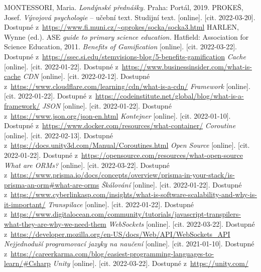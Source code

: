 \begin{thebibliography}{99}
    
     MONTESSORI, Maria. \textit{Londýnské přednášky.}  Praha: Portál, 2019.
      PROKEŠ, Josef. \textit{Vývojová psychologie} – učební text. Studijní text. [online]. [cit. 2022-03-20]. Dostupné z~\url{https://www.fi.muni.cz/~qprokes/socka/socka3.html}
     HARLEN, Wynne (ed.). ASE \textit{guide to primary science education.} Hatfield: Association for Science Education, 2011.
     \textit{Benefits of Gamification} [online]. [cit. 2022-03-22]. Dostupné z~\url{https://ssec.si.edu/stemvisions-blog/5-benefits-gamification}
     \textit{Cache} [online]. [cit. 2022-01-22]. Dostupné z~\url{https://www.businessinsider.com/what-is-cache}
     \textit{CDN} [online]. [cit. 2022-02-12]. Dostupné z~\url{https://www.cloudflare.com/learning/cdn/what-is-a-cdn/}
     \textit{Framework} [online]. [cit. 2022-01-22]. Dostupné z~\url{https://codeinstitute.net/global/blog/what-is-a-framework/}
     \textit{JSON} [online]. [cit. 2022-01-22]. Dostupné z~\url{https://www.json.org/json-en.html}
     \textit{Kontejner} [online]. [cit. 2022-01-10]. Dostupné z~\url{https://www.docker.com/resources/what-container/}
     \textit{Coroutine} [online]. [cit. 2022-02-13]. Dostupné z~\url{https://docs.unity3d.com/Manual/Coroutines.html}
     \textit{Open Source} [online]. [cit. 2022-01-22]. Dostupné z~\url{https://opensource.com/resources/what-open-source}
     \textit{What are ORMs?} [online]. [cit. 2022-03-22]. Dostupné z~\url{https://www.prisma.io/docs/concepts/overview/prisma-in-your-stack/is-prisma-an-orm#what-are-orms}
     \textit{Škálování} [online]. [cit. 2022-01-22]. Dostupné z~\url{https://www.cyberlinkasp.com/insights/what-is-software-scalability-and-why-is-it-important/}
     \textit{Transpilace} [online]. [cit. 2022-01-22]. Dostupné z~\url{https://www.digitalocean.com/community/tutorials/javascript-transpilers-what-they-are-why-we-need-them}
     \textit{WebSockets} [online]. [cit. 2022-03-22]. Dostupné z~\url{https://developer.mozilla.org/en-US/docs/Web/API/WebSockets_API}
     \textit{Nejjednoduší programovací jazyky na naučení} [online]. [cit. 2021-01-10]. Dostupné z~\url{https://careerkarma.com/blog/easiest-programming-languages-to-learn/#Csharp}
     \textit{Unity} [online]. [cit. 2022-03-22]. Dostupné z~\url{https://unity.com/}

\end{thebibliography}
